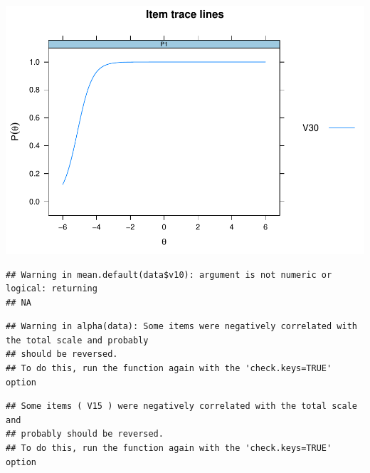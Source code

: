 \documentclass[
  english,
  man]{apa6}
\begin{document}
\includegraphics{ICC_project_files/figure-latex/unnamed-chunk-4-2.pdf}

\begin{verbatim}
## Warning in mean.default(data$v10): argument is not numeric or logical: returning
## NA
\end{verbatim}

\begin{verbatim}
## Warning in alpha(data): Some items were negatively correlated with the total scale and probably 
## should be reversed.  
## To do this, run the function again with the 'check.keys=TRUE' option
\end{verbatim}

\begin{verbatim}
## Some items ( V15 ) were negatively correlated with the total scale and 
## probably should be reversed.  
## To do this, run the function again with the 'check.keys=TRUE' option
\end{verbatim}
\end{document}
